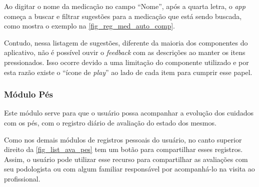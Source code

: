 \begin{figure}[htb]
\begin{minipage}{0.46\textwidth}
    \end{minipage}
\end{figure}

Ao digitar o nome da medicação no campo “Nome”, após a quarta letra, o \emph{app} começa a buscar e filtrar
sugestões para a medicação que está sendo buscada, como mostra o exemplo na \autoref{fig_reg_med_auto_comp}.

Contudo, nessa listagem de sugestões, diferente da maioria dos componentes do aplicativo, não é possível ouvir o
\emph{feedback} com as descrições ao manter os itens pressionados. Isso ocorre devido a uma limitação do
componente utilizado e por esta razão existe o ``ícone de \emph{play}'' ao lado de cada item para cumprir
esse papel.

\subsubsection{Módulo Pés}

Este módulo serve para que o usuário possa acompanhar a evolução dos cuidados com os pés, com o registro
diário de avaliação do estado dos mesmos.

Como nos demais módulos de registros pessoais do usuário, no canto superior direito da \autoref{fig_list_ava_pes}
tem um botão para compartilhar esses registros. Assim, o usuário pode utilizar esse recurso para compartilhar as
avaliações com seu podologista ou com algum familiar responsável por acompanhá-lo na visita ao profissional.

